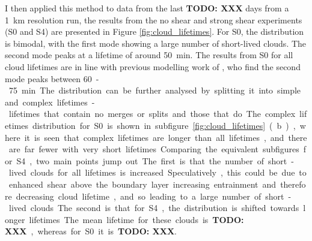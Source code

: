 \documentclass[11pt,a4paper]{article}
\newcommand\todo[1]{\textbf{TODO: #1}}
\begin{document}
I then applied this method to data from the last \todo{XXX} days from a \SI{1}{km} resolution run, the results from the no shear and strong shear experiments (S0 and S4) are presented in Figure \ref{fig:cloud_lifetimes}. 
For S0, the distribution is bimodal, with the first mode showing a large number of short-lived clouds. The second mode peaks at a lifetime of around \SI{50}{min}. 
The results from S0 for all cloud lifetimes are in line with previous modelling work of \cite{plant2009statistical}, who find the second mode peaks between \SI{60}-\SI{75}{min}.

The distribution can be further analysed by splitting it into simple and complex lifetimes - lifetimes that contain no merges or splits and those that do. The complex lifetimes distribution for S0 is shown in subfigure \ref{fig:cloud_lifetimes} (b), where it is seen that complex lifetimes are longer than all lifetimes, and there are far fewer with very short lifetimes. 

Comparing the equivalent subfigures for S4, two main points jump out. The first is that the number of short-lived clouds for all lifetimes is increased. Speculatively, this could be due to enhanced shear above the boundary layer increasing entrainment and therefore decreasing cloud lifetime, and so leading to a large number of short-lived clouds. The second is that for S4, the distribution is shifted towards longer lifetimes. The mean lifetime for these clouds is \todo{XXX}, whereas for S0 it is \todo{XXX}.
\end{document}
